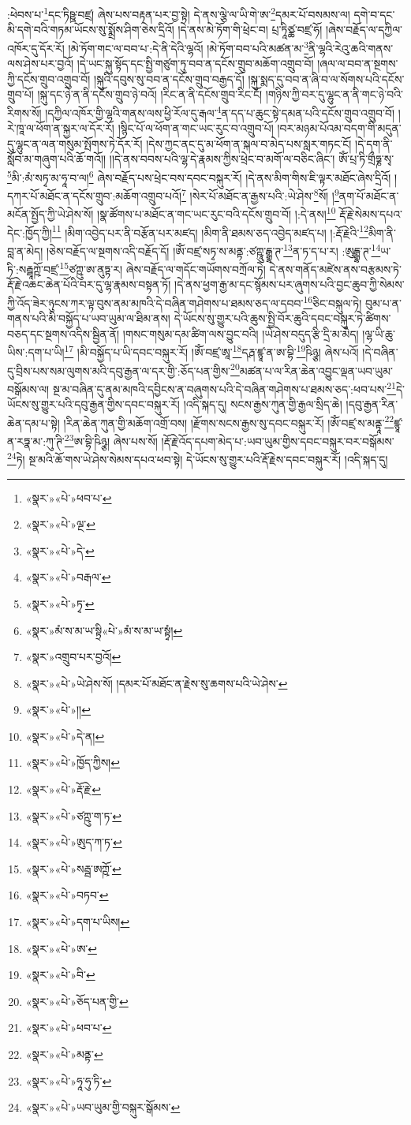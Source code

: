 :ཕེབས་པ་\footnote{«སྣར་»«པེ་»ཕབ་པ་}དང་ཏིཥྛ་བཛྲ། ཞེས་པས་བརྟན་པར་བྱ་སྟེ། དེ་ནས་ལྕེ་ལ་ཡི་གེ་ཨ་\footnote{«སྣར་»«པེ་»ལྔ་}དམར་པོ་བསམས་ལ། དགེ་བ་དང་མི་དགེ་བའི་གཏམ་ཡོངས་སུ་སྨྲོས་ཤིག་ཅེས་དྲིའོ། །དེ་ནས་མེ་ཏོག་གི་ཕྲེང་བ། པྲ་ཏཱིཙྪ་བཛྲ་ཧོ། །ཞེས་བརྗོད་ལ་དཀྱིལ་འཁོར་དུ་དོར་རོ། །མེ་ཏོག་གང་ལ་བབ་པ་:དེ་ནི་དེའི་ལྷའོ། །མེ་ཏོག་བབ་པའི་མཚན་མ་\footnote{«སྣར་»«པེ་»དེ་}ནི་ལྷའི་རེའུ་ཆའི་གནས་ལས་ཤེས་པར་བྱའོ། །དེ་ཡང་སྐུ་སྟོད་དང་སྤྱི་གཙུག་ཏུ་བབ་ན་དངོས་གྲུབ་མཆོག་འགྲུབ་བོ། །ཞལ་ལ་བབ་ན་སྔགས་ཀྱི་དངོས་གྲུབ་འགྲུབ་བོ། །སྐུའི་དབུས་སུ་བབ་ན་དངོས་གྲུབ་བརྒྱད་དོ། །སྐུ་སྨད་དུ་བབ་ན་ཞི་བ་ལ་སོགས་པའི་དངོས་གྲུབ་པོ། །སྐུ་དང་ཉེ་ན་ནི་དངོས་གྲུབ་ཉེ་བའོ། །རིང་ན་ནི་དངོས་གྲུབ་རིང་ངོ། །གཉིས་ཀྱི་བར་དུ་ལྷུང་ན་ནི་གང་ཉེ་བའི་རིགས་སོ། །དཀྱིལ་འཁོར་གྱི་ལྷའི་གནས་ལས་ཕྱི་རོལ་དུ་རྒལ་\footnote{«སྣར་»«པེ་»བརྒལ་}ན་དད་པ་ཆུང་སྟེ་དམན་པའི་དངོས་གྲུབ་འགྲུབ་བོ། །རེ་ཁཱ་ལ་ཕོག་ན་སྐྱར་ལ་དོར་རོ། །སྙིང་པོ་ལ་ཕོག་ན་གང་ཡང་རུང་བ་འགྲུབ་པོ། །བར་མཉམ་པོའམ་བདག་གི་མདུན་དུ་ལྷུང་ན་ལན་གསུམ་སྤོགས་ཏེ་དོར་རོ། །དེས་ཀྱང་ནང་དུ་མ་ཕོག་ན་སྐལ་བ་མེད་པས་སླར་གཏང་ངོ། །དེ་དག་ནི་སློབ་མ་གཞུག་པའི་ཆོ་གའོ།། །།དེ་ནས་བབས་པའི་ལྷ་དེ་རྣམས་ཀྱིས་ཕྲེང་བ་མགོ་ལ་བཅིང་ཞིང་། ཨོཾ་པྲ་ཏི་གྲྀཧྞ་སྭ་\footnote{«སྣར་»«པེ་»ཏྭ་}མི་:མཾ་སཏྭ་མ་ཧཱ་བ་ལ།\footnote{«སྣར་»མཾ་ས་མ་ཡ་སྟྲི«པེ་»མཾ་ས་མ་ཡ་སྟྭཾ།} ཞེས་བརྗོད་པས་ཕྲེང་བས་དབང་བསྐུར་རོ། །དེ་ནས་མིག་གིས་ཇི་ལྟར་མཐོང་ཞེས་དྲིའོ། །དཀར་པོ་མཐོང་ན་དངོས་གྲུབ་:མཆོག་འགྲུབ་པའོ།\footnote{«སྣར་»འགྲུབ་པར་བྱའོ།} །སེར་པོ་མཐོང་ན་རྒྱས་པའི་:ཡེ་ཤེས་\footnote{«སྣར་»«པེ་»ཡེ་ཤེས་སོ། །དམར་པོ་མཐོང་ན་རྗེས་སུ་ཆགས་པའི་ཡེ་ཤེས་}སོ། །\footnote{«སྣར་»«པེ་»།།}ནག་པོ་མཐོང་ན་མངོན་སྤྱོད་ཀྱི་ཡེ་ཤེས་སོ། །སྣ་ཚོགས་པ་མཐོང་ན་གང་ཡང་རུང་བའི་དངོས་གྲུབ་བོ། །:དེ་ནས།\footnote{«སྣར་»«པེ་»དེ་ན།} རྡོ་རྗེ་སེམས་དཔའ་དེང་:ཁྱོད་ཀྱི།\footnote{«སྣར་»«པེ་»ཁྱོད་ཀྱིས།} །མིག་འབྱེད་པར་ནི་བརྩོན་པར་མཛད། །མིག་ནི་ཐམས་ཅད་འབྱེད་མཛད་པ། །:རྡོ་རྗེའི་\footnote{«སྣར་»«པེ་»རྡོ་རྗེ་}མིག་ནི་བླ་ན་མེད། །ཅེས་བརྗོད་ལ་སྔགས་འདི་བརྗོད་དོ། །ཨོཾ་བཛྲ་སཏྭ་ས་མནྟ་:ཙཀྵཱུ་དྒྷ་ཊ་\footnote{«སྣར་»«པེ་»ཙཀྵུ་ག་ཏ་}ན་ཏ་ད་པ་ར། :ཨུདྒྷ་ཊ་\footnote{«སྣར་»«པེ་»ཨུད་ཀ་ཏ་}ཡ་ཏི་:སརྦྦཱཀྵོ་བཛྲ་\footnote{«སྣར་»«པེ་»སརྦྦ་ཨཀྵོ་}ཙཀྵུ་ཨ་ནུཏྟ་ར། ཞེས་བརྗོད་ལ་གདོང་གཡོགས་བཀྲོལ་ཏེ། དེ་ནས་གནོད་མཛེས་ནས་བརྩམས་ཏེ་རྡོ་རྗེ་འཆང་ཆེན་པོའི་བར་དུ་ལྷ་རྣམས་བསྟན་ཏོ། །དེ་ནས་ཕྱག་རྒྱ་མ་དང་སྙོམས་པར་ཞུགས་པའི་བྱང་ཆུབ་ཀྱི་སེམས་ཀྱི་འོད་ཟེར་ཉུངས་ཀར་ལྟ་བུས་ནམ་མཁའི་དེ་བཞིན་གཤེགས་པ་ཐམས་ཅད་ལ་དབབ་\footnote{«སྣར་»«པེ་»བཏབ་}ཅིང་བསྐུལ་ཏེ། བུམ་པ་ན་གནས་པའི་མི་བསྐྱོད་པ་ཡབ་ཡུམ་ལ་ཐིམ་ནས། དེ་ཡོངས་སུ་གྱུར་པའི་ཆུས་སྤྱི་བོར་ཆུའི་དབང་བསྐུར་ཏེ་ཚིགས་བཅད་དང་སྔགས་འདིས་སྦྱིན་ནོ། །གསང་གསུམ་དམ་ཚིག་ལས་བྱུང་བའི། །ཡེ་ཤེས་བདུད་རྩི་དྲི་མ་མེད། །ལྷ་ཡི་ཆུ་ཡིས་:དག་པ་ཡི།\footnote{«སྣར་»«པེ་»དག་པ་ཡིས།} །མི་བསྐྱོད་པ་ཡི་དབང་བསྐུར་རོ། །ཨོཾ་བཛྲ་ཨཱ་\footnote{«སྣར་»«པེ་»ཨ་}དརྴ་ཛྙཱ་ན་ཨ་བྷི་\footnote{«སྣར་»«པེ་»བི་}ཥིཉྩ། ཞེས་པའོ། །དེ་བཞིན་དུ་བྲིས་པས་སམ་ལུགས་མའི་དབུ་རྒྱན་ལ་དར་གྱི་:ཅོད་པན་གྱིས་\footnote{«སྣར་»«པེ་»ཅོད་པན་གྱི་}མཚན་པ་ལ་རིན་ཆེན་འབྱུང་ལྡན་ཡབ་ཡུམ་བསྒོམས་ལ། སྔ་མ་བཞིན་དུ་ནམ་མཁའི་དབྱིངས་ན་བཞུགས་པའི་དེ་བཞིན་གཤེགས་པ་ཐམས་ཅད་:ཕབ་པས་\footnote{«སྣར་»«པེ་»ཕབ་པ་}དེ་ཡོངས་སུ་གྱུར་པའི་དབུ་རྒྱན་གྱིས་དབང་བསྐུར་རོ། །འདི་སྐད་དུ། སངས་རྒྱས་ཀུན་གྱི་རྒྱལ་སྲིད་ཆེ། །དབུ་རྒྱན་རིན་ཆེན་དམ་པ་སྟེ། །རིན་ཆེན་ཀུན་གྱི་མཆོག་འགྲོ་བས། །རྫོགས་སངས་རྒྱས་སུ་དབང་བསྐུར་རོ། །ཨོཾ་བཛྲ་ས་མནྟཱ་\footnote{«སྣར་»«པེ་»མནྟ་}ཛྙཱ་ན་རཏྣ་མ་:ཀུ་ཊི་\footnote{«སྣར་»«པེ་»ཧཱ་ཧུ་ཏི་}ཨ་བྷི་ཥིཉྩ། ཞེས་པས་སོ། །རྡོ་རྗེ་འོད་དཔག་མེད་པ་:ཡབ་ཡུམ་གྱིས་དབང་བསྐུར་བར་བསྒོམས་\footnote{«སྣར་»«པེ་»ཡབ་ཡུམ་གྱི་བསྐུར་སྒོམས་}ཏེ། སྔ་མའི་ཆོ་གས་ཡེ་ཤེས་སེམས་དཔའ་ཕབ་སྟེ། དེ་ཡོངས་སུ་གྱུར་པའི་རྡོ་རྗེས་དབང་བསྐུར་རོ། །འདི་སྐད་དུ། 